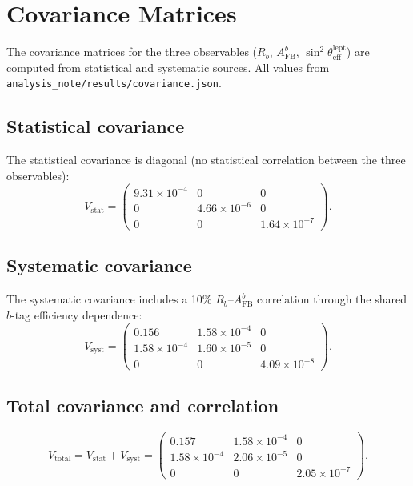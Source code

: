 \documentclass[11pt,a4paper]{article}
\begin{document}
\section{Covariance Matrices}
\label{app:covariance}

The covariance matrices for the three observables ($R_b$, $A_\mathrm{FB}^b$,
$\sin^2\theta_\mathrm{eff}^\mathrm{lept}$) are computed from statistical and systematic
sources. All values from \texttt{analysis\_note/results/covariance.json}.

\subsection{Statistical covariance}

The statistical covariance is diagonal (no statistical correlation between the three
observables):
\begin{equation}
V_\mathrm{stat} = \begin{pmatrix}
9.31 \times 10^{-4} & 0 & 0 \\
0 & 4.66 \times 10^{-6} & 0 \\
0 & 0 & 1.64 \times 10^{-7}
\end{pmatrix}.
\label{eq:stat_cov}
\end{equation}

\subsection{Systematic covariance}

The systematic covariance includes a 10\% $R_b$--$A_\mathrm{FB}^b$ correlation through
the shared $b$-tag efficiency dependence:
\begin{equation}
V_\mathrm{syst} = \begin{pmatrix}
0.156 & 1.58 \times 10^{-4} & 0 \\
1.58 \times 10^{-4} & 1.60 \times 10^{-5} & 0 \\
0 & 0 & 4.09 \times 10^{-8}
\end{pmatrix}.
\label{eq:syst_cov}
\end{equation}

\subsection{Total covariance and correlation}

\begin{equation}
V_\mathrm{total} = V_\mathrm{stat} + V_\mathrm{syst} = \begin{pmatrix}
0.157 & 1.58 \times 10^{-4} & 0 \\
1.58 \times 10^{-4} & 2.06 \times 10^{-5} & 0 \\
0 & 0 & 2.05 \times 10^{-7}
\end{pmatrix}.
\label{eq:total_cov}
\end{equation}
\end{document}
